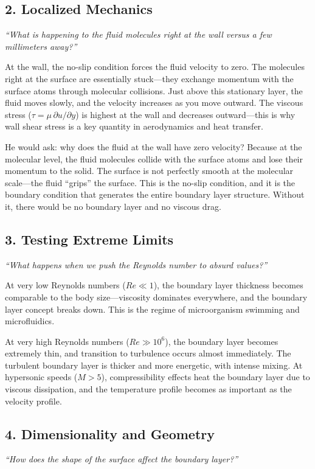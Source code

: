 \documentclass[11pt,openright]{book}
\begin{document}
\subsection*{2. Localized Mechanics}
\textit{``What is happening to the fluid molecules right at the wall versus a few millimeters away?''}

At the wall, the no-slip condition forces the fluid velocity to zero. The molecules right at the surface are essentially stuck---they exchange momentum with the surface atoms through molecular collisions. Just above this stationary layer, the fluid moves slowly, and the velocity increases as you move outward. The viscous stress ($\tau = \mu \, \partial u / \partial y$) is highest at the wall and decreases outward---this is why wall shear stress is a key quantity in aerodynamics and heat transfer.

He would ask: why does the fluid at the wall have zero velocity? Because at the molecular level, the fluid molecules collide with the surface atoms and lose their momentum to the solid. The surface is not perfectly smooth at the molecular scale---the fluid ``grips'' the surface. This is the no-slip condition, and it is the boundary condition that generates the entire boundary layer structure. Without it, there would be no boundary layer and no viscous drag.

\subsection*{3. Testing Extreme Limits}
\textit{``What happens when we push the Reynolds number to absurd values?''}

At very low Reynolds numbers ($Re \ll 1$), the boundary layer thickness becomes comparable to the body size---viscosity dominates everywhere, and the boundary layer concept breaks down. This is the regime of microorganism swimming and microfluidics.

At very high Reynolds numbers ($Re \gg 10^6$), the boundary layer becomes extremely thin, and transition to turbulence occurs almost immediately. The turbulent boundary layer is thicker and more energetic, with intense mixing. At hypersonic speeds ($M > 5$), compressibility effects heat the boundary layer due to viscous dissipation, and the temperature profile becomes as important as the velocity profile.

\subsection*{4. Dimensionality and Geometry}
\textit{``How does the shape of the surface affect the boundary layer?''}
\end{document}
